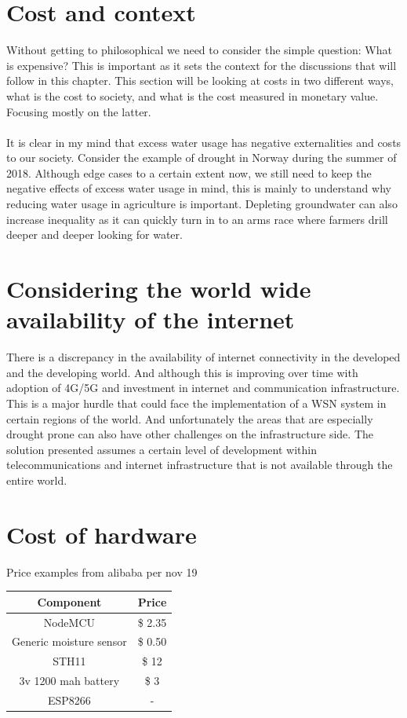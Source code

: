 \documentclass[]{uiophd}
\begin{document}
\section{Cost and context}
Without getting to philosophical we need to consider the simple question: What is expensive? This is important as it sets the context for the discussions that will follow in this chapter. This section will be looking at costs in two different ways, what is the cost to society, and what is the cost measured in monetary value. Focusing mostly on the latter. 
\\\\
It is clear in my mind that excess water usage has negative externalities and costs to our society. Consider the  example of drought in Norway during the summer of 2018. Although edge cases to a certain extent now, we still need to keep the negative effects of excess water usage in mind, this is mainly to understand why reducing water usage in agriculture is important. Depleting groundwater can also increase inequality as it can quickly turn in to an arms race where farmers drill deeper and deeper looking for water.
\section{Considering the world wide availability of the internet}
There is a discrepancy in the availability of internet connectivity in the developed and the developing world. And although this is improving over time with adoption of 4G/5G and investment in internet and communication infrastructure. This is a major hurdle that could face the implementation of a WSN system in certain regions of the world. And unfortunately the areas that are especially drought prone can also have other challenges on the infrastructure side. The solution presented assumes a certain level of development within telecommunications and internet infrastructure that is not available through the entire world.
\section{Cost of hardware}

Price examples from alibaba per nov 19

\begin{center}
 \begin{tabular}{||c | c||} 
 \hline
 Component & Price \\ [0.5ex] 
 \hline\hline
 NodeMCU & \$ 2.35 \\ 
 \hline
 Generic moisture sensor & \$ 0.50 \\
 \hline
 STH11 & \$ 12 \\
 \hline
 3v 1200 mah battery & \$ 3 \\
 \hline
 ESP8266 & - \\ [1ex] 
 \hline
\end{tabular}
\end{center}
\end{document}

